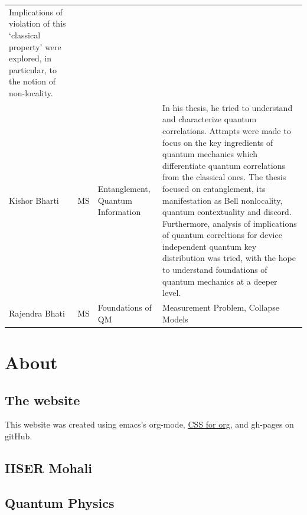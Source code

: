 \documentclass[11pt]{article}
\begin{document}
\begin{center}
\begin{tabular}{llll}
Implications of violation of this `classical property' were explored, in particular, to the notion of non-locality.\\
Kishor Bharti & MS & Entanglement, Quantum Information & In his thesis, he tried to understand and characterize quantum correlations. Attmpts were made to focus on the key ingredients of quantum mechanics which differentiate quantum correlations from the classical ones. The thesis focused on entanglement, its manifestation as Bell nonlocality, quantum contextuality and discord. Furthermore, analysis of implications of quantum correltions for device independent quantum key distribution was tried, with the hope to understand foundations of quantum mechanics at a deeper level.\\
Rajendra Bhati & MS & Foundations of QM & Measurement Problem, Collapse Models\\
\end{tabular}
\end{center}


\section{About}
\label{sec-3}
\subsection{The website}
\label{sec-3-1}
This website was created using emacs's org-mode, \href{https://github.com/fniessen/org-html-themes}{CSS for org}, and gh-pages on gitHub.
\subsection{IISER Mohali}
\label{sec-3-2}
\subsection{Quantum Physics}
\label{sec-3-3}
\end{document}
